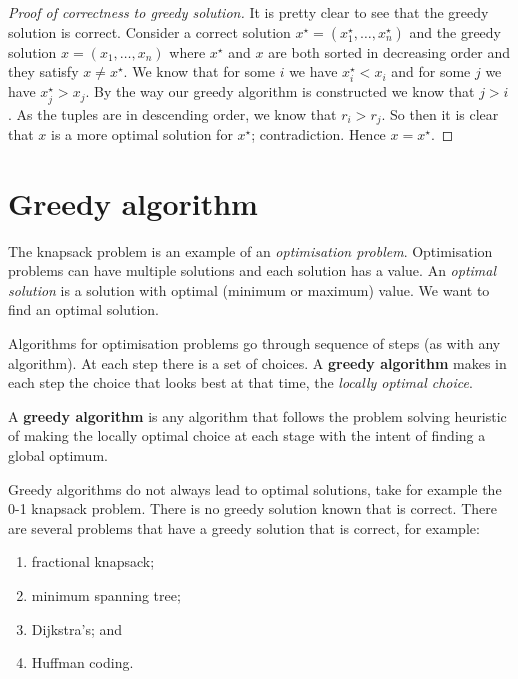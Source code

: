 \begin{proof}[Proof of correctness to greedy solution]
    It is pretty clear to see that the greedy solution is correct. 
    Consider a correct solution 
    $x^\star = (x^\star_1, \ldots, x^\star_n)$ 
    and the greedy solution 
    $x = (x_1, \ldots, x_n)$ 
    where $x^\star$ and $x$ are both sorted in decreasing order and they satisfy 
    $x \neq x^\star$. 
    We know that for some $i$ we have 
    $x^\star_i < x_i$ 
    and for some $j$ we have 
    $x^\star_j > x_j$. 
    By the way our greedy algorithm is constructed we know that $j > i$. 
    As the tuples are in descending order, 
    we know that $r_i > r_j$. 
    So then it is clear that $x$ is a more optimal solution for $x^\star$; 
    contradiction. Hence $x = x^\star$.
\end{proof}

\section{Greedy algorithm}

The knapsack problem is an example of an \emph{optimisation problem}. 
Optimisation problems can have multiple solutions and each solution has a value. 
An \emph{optimal solution} is a solution with optimal (minimum or maximum) value. 
We want to find an optimal solution. 

Algorithms for optimisation problems go through sequence of steps (as with any algorithm). 
At each step there is a set of choices. 
A \textbf{greedy algorithm} makes in each step the choice that looks best at that time, 
the \emph{locally optimal choice}.

\begin{definition}
    A \textbf{greedy algorithm} is any algorithm that follows the problem solving heuristic of making the locally optimal choice at each stage with the intent of finding a global optimum.
\end{definition}

Greedy algorithms do not always lead to optimal solutions, 
take for example the 0-1 knapsack problem. 
There is no greedy solution known that is correct. 
There are several problems that have a greedy solution that is correct,
for example:
\begin{enumerate}
    \item fractional knapsack;
    \item minimum spanning tree;
    \item Dijkstra's; and
    \item Huffman coding.
\end{enumerate}

